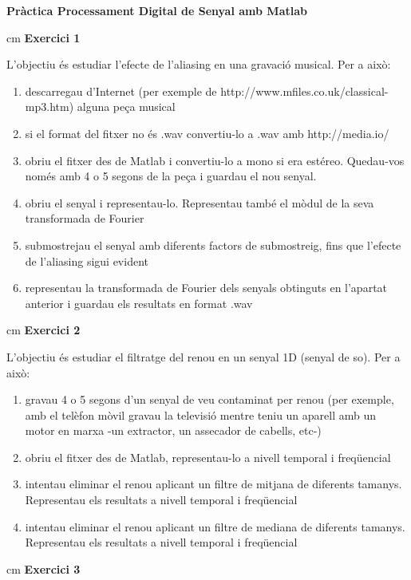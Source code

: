 \documentclass{article}
\begin{document}
\textbf{\Large Pràctica Processament Digital de Senyal amb Matlab}


 cm
\noindent
\textbf{Exercici 1}

L'objectiu és estudiar l'efecte de l'aliasing en una gravació musical.
Per a això:
\begin{enumerate}[1)]
\item descarregau d'Internet (per exemple de http://www.mfiles.co.uk/classical-mp3.htm) alguna peça musical
\item si el format del fitxer no és .wav convertiu-lo a .wav amb http://media.io/
\item obriu el fitxer des de Matlab i convertiu-lo a mono si era estéreo. Quedau-vos només amb 4 o 5 segons de la peça
i guardau el nou senyal.
\item obriu el senyal i representau-lo. Representau també el mòdul de la seva transformada de Fourier
\item submostrejau el senyal amb diferents factors de submostreig, fins que l'efecte de l'aliasing sigui evident
\item representau la transformada de Fourier dels senyals obtinguts en l'apartat anterior i guardau els resultats en
format .wav
\end{enumerate}


 cm
\noindent
\textbf{Exercici 2}

L'objectiu és estudiar el filtratge del renou en un senyal 1D (senyal de so).
Per a això:
\begin{enumerate}[1)]
\item gravau 4 o 5 segons d'un senyal de veu contaminat per renou (per exemple, amb el telèfon mòvil gravau la televisió mentre teniu
un aparell amb un motor en marxa -un extractor, un assecador de cabells, etc-)
\item obriu el fitxer des de Matlab, representau-lo a nivell temporal i freqüencial
\item intentau eliminar el renou aplicant un filtre de mitjana de diferents tamanys. Representau els resultats a nivell temporal i freqüencial
\item intentau eliminar el renou aplicant un filtre de mediana de diferents tamanys. Representau els resultats a nivell temporal i freqüencial
\end{enumerate}

 cm
\noindent
\textbf{Exercici 3}
\end{document}
